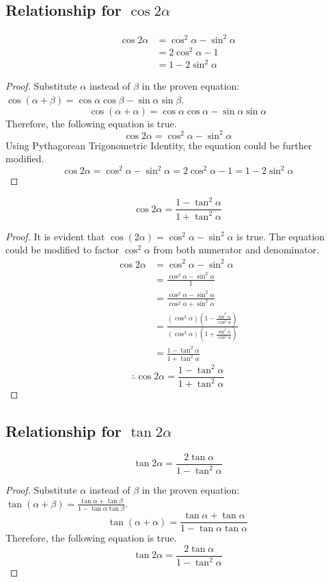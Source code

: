 \documentclass{article}
\begin{document}
\subsection{Relationship for $\cos2\alpha$}
\begin{align*}
    \cos2\alpha&=\cos^2\alpha-\sin^2\alpha \\
    &=2\cos^2\alpha-1 \\
    &=1-2\sin^2\alpha
\end{align*}
\begin{proof}
    Substitute $\alpha$ instead of $\beta$ in the proven equation:
    $\cos(\alpha+\beta)=\cos\alpha\cos\beta-\sin\alpha\sin\beta$.
    \[
    \cos(\alpha+\alpha)=\cos\alpha\cos\alpha-\sin\alpha\sin\alpha
    \]
    Therefore, the following equation is true.
    \[
    \cos2\alpha=\cos^2\alpha-\sin^2\alpha
    \]
    Using Pythagorean Trigonometric Identity, the equation could be further modified.
    \[
    \cos2\alpha=\cos^2\alpha-\sin^2\alpha=2\cos^2\alpha-1=1-2\sin^2\alpha
    \]
\end{proof}
    \[
    \cos2\alpha=\frac{1-\tan^2\alpha}{1+\tan^2\alpha}
    \]
\begin{proof}
    It is evident that $\cos(2\alpha)=\cos^2\alpha-\sin^2\alpha$ is true. The equation could be modified to factor $\cos^2\alpha$ from both numerator and denominator.
    \begin{align*}
    \cos2\alpha&=\cos^2\alpha-\sin^2\alpha \\
    &=\frac{\cos^2\alpha-\sin^2\alpha}{1} \\
    &=\frac{\cos^2\alpha-\sin^2\alpha}{\cos^2\alpha+\sin^2\alpha} \\
    &=\frac{(\cos^2\alpha)(1-\frac{\sin^2\alpha}{\cos^2\alpha})}{(\cos^2\alpha)(1+\frac{\sin^2\alpha}{\cos^2\alpha})} \\
    &=\frac{1-\tan^2\alpha}{1+\tan^2\alpha}
    \end{align*}
    \[
    \therefore \cos2\alpha=\frac{1-\tan^2\alpha}{1+\tan^2\alpha}
    \]
\end{proof}

\subsection{Relationship for $\tan2\alpha$}
\[
\tan2\alpha=\frac{2\tan\alpha}{1-\tan^2\alpha}
\]
\begin{proof}
    Substitute $\alpha$ instead of $\beta$ in the proven equation:
    $\tan(\alpha+\beta)=\frac{\tan\alpha+\tan\beta}{1-\tan\alpha\tan\beta}$.
    \[
    \tan(\alpha+\alpha)=\frac{\tan\alpha+\tan\alpha}{1-\tan\alpha\tan\alpha}
    \]
    Therefore, the following equation is true.
    \[
    \tan2\alpha=\frac{2\tan\alpha}{1-\tan^2\alpha}
    \]
\end{proof}
\end{document}
